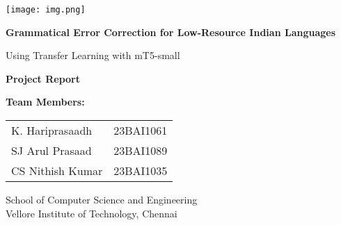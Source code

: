 \documentclass[12pt,a4paper]{article}
\begin{document}
\begin{titlepage}
    \centering
    
    \texttt{[image: img.png]}
    \vspace{1cm}
    
    {\Huge\bfseries Grammatical Error Correction for Low-Resource Indian Languages\par}
    \vspace{0.5cm}
    {\Large Using Transfer Learning with mT5-small\par}
    \vspace{2cm}
    
    {\Large\textbf{Project Report}\par}
    \vspace{1.5cm}
    
    {\large
    \textbf{Team Members:}\par
    \vspace{0.5cm}
    \begin{tabular}{ll}
        K. Hariprasaadh & 23BAI1061 \\
        SJ Arul Prasaad & 23BAI1089 \\
        CS Nithish Kumar & 23BAI1035 \\
    \end{tabular}
    \par}
    
    \vfill
    
    {\large
    School of Computer Science and Engineering\\
    Vellore Institute of Technology, Chennai\\
    \par}
\end{titlepage}

\tableofcontents
\newpage

\begin{abstract}
This project presents a comprehensive deep learning solution for Grammatical Error Correction (GEC) in low-resource Indian languages using Google's mT5 (Multilingual Text-to-Text Transfer Transformer) architecture. We address the critical challenge of correcting grammatical errors in five Indic scripts: Tamil, Telugu, Hindi, Bangla, and Malayalam. Through transfer learning and careful optimization of training strategies, we demonstrate that effective GEC systems can be built even with minimal training data. Our best-performing model (Hindi) achieves a GLEU score of 0.8236 with only 600 training samples, while maintaining training times under 15 minutes on consumer-grade hardware (RTX 3050 4GB). This work shows the feasibility of developing practical NLP tools for low-resource languages without requiring extensive computational resources or large annotated datasets.

\textbf{Keywords:} Grammatical Error Correction, Low-Resource Languages, Transfer Learning, mT5, Indian Languages, Natural Language Processing
\end{abstract}
\end{document}
